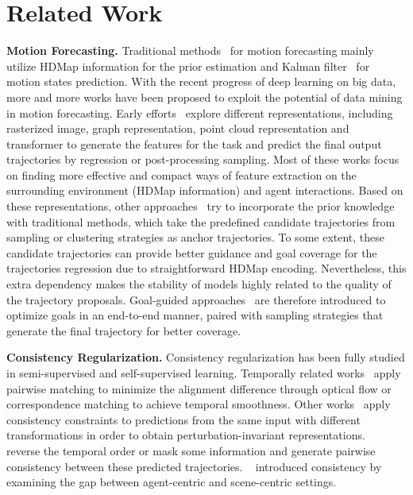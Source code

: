 \documentclass[10pt,twocolumn,letterpaper]{article}
\begin{document}
\section{Related Work}
\noindent\textbf{Motion Forecasting.} Traditional methods~\cite{houenou2013vehicle,schulz2018interaction,xie2017vehicle,ziegler2014making} for motion forecasting mainly utilize HDMap information for the prior estimation and Kalman filter~\cite{kalman1960new} for motion states prediction. With the recent progress of deep learning on big data, more and more works have been proposed to exploit the potential of data mining in motion forecasting. Early efforts~\cite{bansal2018chauffeurnet,chai2019multipath,duvenaud2015convolutional,gao2020vectornet,henaff2015deep,liang2020learning,liu2021multimodal,shuman2013emerging,song2022learning,ye2021tpcn,zeng2021lanercnn,zhou2022hivt} explore different representations, including rasterized image, graph representation, point cloud representation and transformer to generate the features for the task and predict the final output trajectories by regression or post-processing sampling. Most of these works focus on finding more effective and compact ways of feature extraction on the surrounding environment (HDMap information) and agent interactions. Based on these representations, other approaches~\cite{casas2018intentnet,mangalam2020not,song2022learning,zeng2021lanercnn,zeng2019end,zhao2020tnt} try to incorporate the prior knowledge with traditional methods, which take the predefined candidate trajectories from sampling or clustering strategies as anchor trajectories. To some extent, these candidate trajectories can provide better guidance and goal coverage for the trajectories regression due to straightforward HDMap encoding. Nevertheless, this extra dependency makes the stability of models highly related to the quality of the trajectory proposals.
Goal-guided approaches~\cite{gilles2021home,gu2021densetnt,gilles2022gohome} are therefore introduced to optimize goals in an end-to-end manner, paired with sampling strategies that generate the final trajectory for better coverage.





\noindent\textbf{Consistency Regularization.} Consistency regularization has been fully studied in semi-supervised and self-supervised learning. Temporally related works~\cite{wang2019learning,lei2020blind,zhou2017unsupervised} apply pairwise matching to minimize the alignment difference through optical flow or correspondence matching to achieve temporal smoothness. Other works~\cite{bachman2014learning,foldiak1991learning,Ouyang_2021_ICCV,sajjadi2016regularization,Wang_2021_ICCV,simard1991tangent} apply consistency constraints to predictions from the same input with different transformations in order to obtain perturbation-invariant representations. 
 ~\cite{chakraborty2022improving, bhattacharyya2022ssl} reverse the temporal order or mask some information and generate pairwise consistency between these predicted trajectories.  ~\cite{su2022narrowing} introduced consistency by examining the gap between agent-centric and scene-centric settings.
\end{document}
